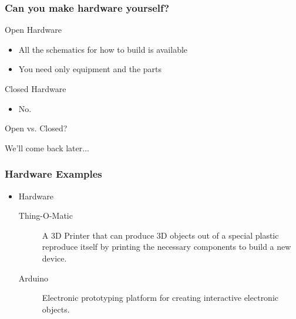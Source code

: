 \documentclass{beamer}
\begin{document}
\begin{frame}
  \frametitle{Can you make hardware yourself?}
  \begin{Large} Open Hardware \end{Large}
  \begin{itemize}
  \item All the schematics for how to build is available
  \item You need only equipment and the parts
  \end{itemize}

  \begin{Large} Closed Hardware \end{Large}
  \begin{itemize}
  \item No.
  \end{itemize}
\end{frame}

\begin{frame}
  \begin{center}
    \begin{Huge}
      Open vs. Closed?
    \end{Huge}

    We'll come back later...
  \end{center}
\end{frame}

\begin{frame}
  \frametitle{Hardware Examples}
  \begin{itemize}
  \item Hardware
    \begin{description}
    \item[Thing-O-Matic] A \textcolor{beamer@myblue}{3D} Printer that
      can produce 3D objects out of a special plastic
      \textcolor{beamer@myblue}{reproduce} itself by printing the
      necessary components to build a new device.
    \item[Arduino] Electronic prototyping platform for creating
      interactive electronic objects.
    \end{description}
  \end{itemize}
\end{frame}
\end{document}
